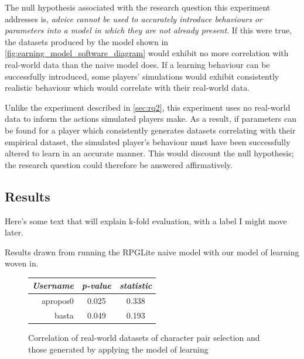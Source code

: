 The null hypothesis associated with the research question this experiment
addresses is, \emph{advice cannot be used to accurately introduce behaviours or
parameters into a model in which they are not already present}. If this were
true, the datasets produced by the \aspectoriented model shown in
\cref{fig:earning_model_software_diagram} would exhibit no more correlation with
real-world data than the naive model does. If a learning behaviour can be
successfully introduced, some players' simulations would exhibit consistently
realistic behaviour which would correlate with their real-world data.

Unlike the experiment described in \cref{sec:rq2}, this experiment uses no
real-world data to inform the actions simulated players make. As a result, if
parameters can be found for a player which consistently generates datasets
correlating with their empirical dataset, the simulated player's behaviour must
have been successfully altered to learn in an accurate manner. This would
discount the null hypothesis; the research question could therefore be answered
affirmatively.




\subsection{Results}


Here's some text that will explain k-fold evaluation, with a label I might move later.
\label{k-fold-evaluation-explanation}

Results drawn from running the RPGLite naive model with our model of learning
woven in.

\begin{figure}[h]
  \centering
  
  \begin{minipage}{.7\textwidth}
    \centering
    \begin{tabular}{r|c|c}
      \emph{Username} & \emph{p-value} & \emph{\tau{} statistic} \\\hline\hline
      apropos0 & 0.025 & 0.338 \\
      basta & 0.049 & 0.193 \\
    \end{tabular}
    \caption{Correlation of real-world datasets of character pair selection and those generated by applying the \aspectoriented model of learning}
    \label{learning_model_results_table_comparison_to_real_world_datasets}
  \end{minipage}
  
\end{figure}




